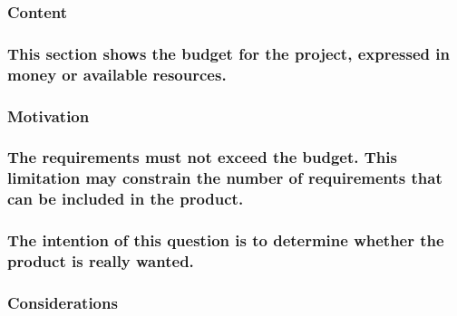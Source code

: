 \documentclass[
]{article}
\begin{document}
\hypertarget{content-16}{%
\subsubsection{Content}\label{content-16}}

\hypertarget{this-section-shows-the-budget-for-the-project-expressed-in-money-or-available-resources.}{%
\subsubsection{\texorpdfstring{This section shows the budget for the
project, expressed in money or available resources.
}{This section shows the budget for the project, expressed in money or available resources. }}\label{this-section-shows-the-budget-for-the-project-expressed-in-money-or-available-resources.}}

\hypertarget{motivation-16}{%
\subsubsection{Motivation}\label{motivation-16}}

\hypertarget{the-requirements-must-not-exceed-the-budget.-this-limitation-may-constrain-the-number-of-requirements-that-can-be-included-in-the-product.}{%
\subsubsection{The requirements must not exceed the budget. This
limitation may constrain the number of requirements that can be included
in the
product.}\label{the-requirements-must-not-exceed-the-budget.-this-limitation-may-constrain-the-number-of-requirements-that-can-be-included-in-the-product.}}

\hypertarget{the-intention-of-this-question-is-to-determine-whether-the-product-is-really-wanted.}{%
\subsubsection{The intention of this question is to determine whether
the product is really
wanted.}\label{the-intention-of-this-question-is-to-determine-whether-the-product-is-really-wanted.}}

\hypertarget{considerations-8}{%
\subsubsection{Considerations}\label{considerations-8}}
\end{document}
